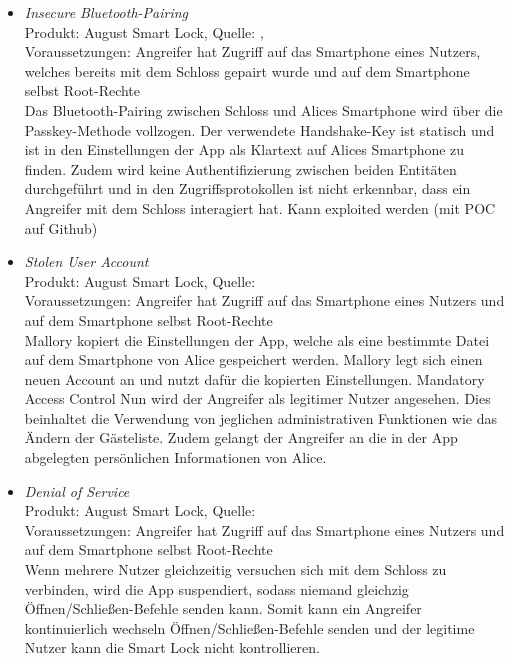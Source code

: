    
    \begin{itemize}[leftmargin=0cm,label={}]
        \item \emph{Insecure Bluetooth-Pairing}\\
            Produkt: August Smart Lock, Quelle: \cite{Rose2016},\cite{Ye2017}\\
            Voraussetzungen: Angreifer hat Zugriff auf das Smartphone eines Nutzers, welches bereits mit dem Schloss gepairt wurde und auf dem Smartphone selbst Root-Rechte\\
            Das Bluetooth-Pairing zwischen Schloss und Alices Smartphone wird über die Passkey-Methode vollzogen. 
            Der verwendete Handshake-Key ist statisch und ist in den Einstellungen der App als Klartext auf Alices Smartphone zu finden. 
            Zudem wird keine Authentifizierung zwischen beiden Entitäten durchgeführt und in den Zugriffsprotokollen ist nicht erkennbar, dass ein Angreifer mit dem Schloss interagiert hat. 
            Kann exploited werden (mit POC auf Github)
        \item \emph{Stolen User Account}\\
            Produkt: August Smart Lock, Quelle: \cite{Ye2017}\\ 
            Voraussetzungen: Angreifer hat Zugriff auf das Smartphone eines Nutzers und auf dem Smartphone selbst Root-Rechte\\
            Mallory kopiert die Einstellungen der App, welche als eine bestimmte Datei auf dem Smartphone von Alice gespeichert werden.
		    Mallory legt sich einen neuen Account an und nutzt dafür die kopierten Einstellungen. \textrightarrow Mandatory Access Control 
		    Nun wird der Angreifer als legitimer Nutzer angesehen.
		    Dies beinhaltet die Verwendung von jeglichen administrativen Funktionen wie das Ändern der Gästeliste.
		    Zudem gelangt der Angreifer an die in der App abgelegten persönlichen Informationen von Alice.
	    \item \emph{Denial of Service}\\
	        Produkt: August Smart Lock, Quelle: \cite{Ye2017}\\ 
            Voraussetzungen: Angreifer hat Zugriff auf das Smartphone eines Nutzers und auf dem Smartphone selbst Root-Rechte\\
            Wenn mehrere Nutzer gleichzeitig versuchen sich mit dem Schloss zu verbinden, wird die App suspendiert, sodass niemand gleichzig Öffnen/\-Schließen-Befehle senden kann. 
		    Somit kann ein Angreifer kontinuierlich wechseln Öffnen/Schließen-Befehle senden und der legitime Nutzer kann die Smart Lock nicht kontrollieren. 

\end{itemize}
